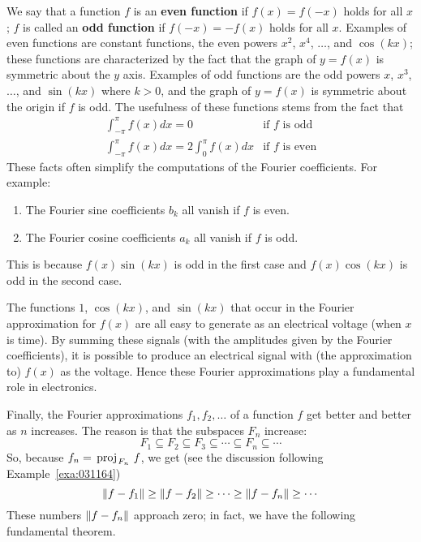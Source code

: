 We say that a function $f$ is an \textbf{even function} if $f(x) = f(-x)$ holds for all $x$; $f$ is called an \textbf{odd function} if $f(-x) = -f(x)$ holds for all $x$. Examples of even functions are constant functions, the even powers $x^{2}$, $x^{4}$, $\dots$, and $\cos(kx)$; these functions are characterized by the fact that the graph of $y = f(x)$ is symmetric about the $y$ axis. Examples of odd functions are the odd powers $x$, $x^{3}$, $\dots$, and $\sin(kx)$ where $k > 0$, and the graph of $y = f(x)$ is symmetric about the origin if $f$ is odd. The usefulness of these functions stems from the fact that
\begin{equation*}
\begin{array}{ll}
\int_{-\pi}^{\pi} f(x)dx = 0 & \mbox{if } f \mbox{ is odd} \\
\int_{-\pi}^{\pi} f(x)dx = 2 \int_{0}^{\pi} f(x)dx & \mbox{if } f \mbox{ is even}
\end{array}
\end{equation*}
These facts often simplify the computations of the Fourier coefficients. For example:

\begin{enumerate}
\item The Fourier sine coefficients $b_{k}$ all vanish if $f$ is even.

\item The Fourier cosine coefficients $a_{k}$ all vanish if $f$ is odd.
\end{enumerate}
This is because $f(x) \sin(kx)$ is odd in the first case and $f(x) \cos(kx)$ is odd in the second case.

The functions $1$, $\cos(kx)$, and $\sin(kx)$ that occur in the Fourier approximation for $f(x)$ are all easy to generate as an electrical voltage (when $x$ is time). By summing these signals (with the amplitudes given by the Fourier coefficients), it is possible to produce an electrical signal with (the approximation to) $f(x)$ as the voltage. Hence these Fourier approximations play a fundamental role in electronics.

Finally, the Fourier approximations $f_{1}, f_{2}, \dots$ of a function $f$ get better and better as $n$ increases. The reason is that the subspaces $F_{n}$ increase:
\begin{equation*}
F_1 \subseteq F_2 \subseteq F_3 \subseteq \cdots \subseteq F_n \subseteq \cdots
\end{equation*}
So, because $f_n = \thinspace\operatorname{proj\medspace}_{\!F_n}\,{f}$, we get (see the discussion following Example~\ref{exa:031164})
\begin{equation*}
\| f - f_1 \| \geq 
\| f - f_2 \| \geq \cdots \geq 
\| f - f_n \| \geq \cdots
\end{equation*}
These numbers $\| f - f_{n} \|$ approach zero; in fact, we have the following fundamental theorem. %

